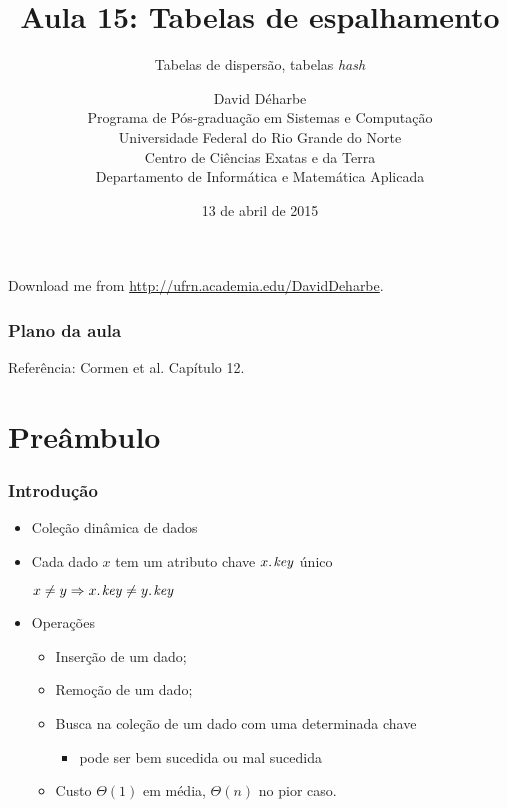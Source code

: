 \documentclass{beamer}
\title{Aula 15: Tabelas de espalhamento}
\subtitle{Tabelas de dispersão, tabelas \textit{hash\/}}
\author{David Déharbe \\
  Programa de Pós-graduação em Sistemas e Computação \\
  Universidade Federal do Rio Grande do Norte \\
  Centro de Ciências Exatas e da Terra \\
  Departamento de Informática e Matemática Aplicada}
\date{13 de abril de 2015}
\begin{document}
\begin{frame}
  \titlepage
  Download me from \url{http://ufrn.academia.edu/DavidDeharbe}.
\end{frame}

\begin{frame}
  \frametitle{Plano da aula}
  \tableofcontents

  \alert{Referência}: Cormen et al. Capítulo 12.
\end{frame}

\section{Preâmbulo}

\begin{frame}

  \frametitle{Introdução}

  \begin{itemize}

    \item Coleção dinâmica de dados

    \item Cada dado $x$ tem um atributo \alert{chave} $\attrib{x}{key}$
      \alert{único}

      $x \neq y \Rightarrow \attrib{x}{key} \neq \attrib{y}{key}$

    \item Operações

      \begin{itemize}

        \item Inserção de um dado;

        \item Remoção de um dado;

        \item Busca na coleção de um dado com uma determinada chave

          \begin{itemize}

            \item pode ser bem sucedida ou mal sucedida

          \end{itemize}

        \item Custo $\Theta(1)$ em média, $\Theta(n)$ no pior caso.

      \end{itemize}

  \end{itemize}

\end{frame}
\end{document}
